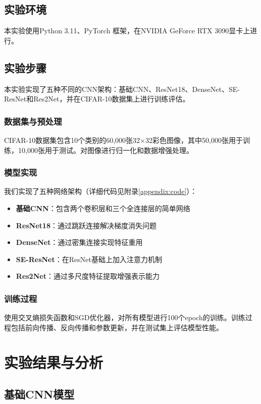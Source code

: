 \documentclass[12pt,a4paper]{article}
\begin{document}
\subsection{实验环境}
本实验使用Python 3.11、PyTorch 框架，在NVIDIA GeForce RTX 3090显卡上进行。

\subsection{实验步骤}
本实验实现了五种不同的CNN架构：基础CNN、ResNet18、DenseNet、SE-ResNet和Res2Net，并在CIFAR-10数据集上进行训练评估。

\subsubsection{数据集与预处理}
CIFAR-10数据集包含10个类别的60,000张32×32彩色图像，其中50,000张用于训练，10,000张用于测试。对图像进行归一化和数据增强处理。

\subsubsection{模型实现}
我们实现了五种网络架构（详细代码见附录\ref{appendix:code}）：
\begin{itemize}
    \item \textbf{基础CNN}：包含两个卷积层和三个全连接层的简单网络
    \item \textbf{ResNet18}：通过跳跃连接解决梯度消失问题
    \item \textbf{DenseNet}：通过密集连接实现特征重用
    \item \textbf{SE-ResNet}：在ResNet基础上加入注意力机制
    \item \textbf{Res2Net}：通过多尺度特征提取增强表示能力
\end{itemize}

\subsubsection{训练过程}
使用交叉熵损失函数和SGD优化器，对所有模型进行100个epoch的训练。训练过程包括前向传播、反向传播和参数更新，并在测试集上评估模型性能。



\section{实验结果与分析}

\subsection{基础CNN模型}
\end{document}
